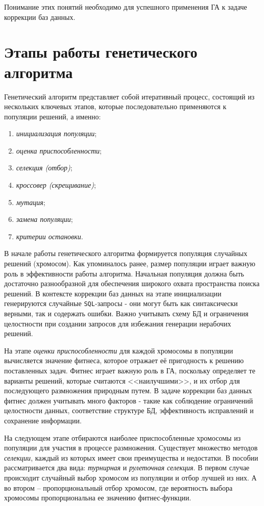 \documentclass[master,paper]{pmk-graduate}
\begin{document}
Понимание этих понятий необходимо для успешного применения ГА к задаче коррекции баз данных.

\section{Этапы работы генетического алгоритма}
\label{sec12} 

Генетический алгоритм представляет собой итеративный процесс, состоящий из нескольких ключевых этапов, которые последовательно применяются к популяции решений, а именно:

\begin{enumerate}
	\item \textit{инициализация популяции};
	\item \textit{оценка приспособленности};
	\item \textit{селекция (отбор)};
	\item \textit{кроссовер (скрещивание)};
	\item \textit{мутация};
	\item \textit{замена популяции};
	\item \textit{критерии остановки}.
\end{enumerate}

В начале работы генетического алгоритма формируется популяция случайных решений (хромосом). Как упоминалось ранее, размер популяции играет важную роль в эффективности работы алгоритма. Начальная популяция должна быть достаточно разнообразной для обеспечения широкого охвата пространства поиска решений. В контексте коррекции баз данных на этапе инициализации генерируются случайные \texttt{SQL}-запросы - они могут быть как синтаксически верными, так и содержать ошибки. Важно учитывать схему БД и ограничения целостности при создании запросов для избежания генерации нерабочих решений.

На этапе \textit{оценки приспособленности} для каждой хромосомы в популяции вычисляется значение фитнеса, которое отражает её пригодность к решению поставленных задач. Фитнес играет важную роль в ГА, поскольку опреде\-ляет те варианты решений, которые считаются <<наилучшими>>, и их отбор для пос\-ледующего размножения природным путем. В задаче коррекции баз данных фитнес должен учитывать много факторов - такие как соблюдение ограничений целостности данных, соответствие структуре БД, эффективность исправ\-лений и сохранение информации.

На следующем этапе отбираются наиболее приспособленные хромосомы из популяции для участия в процессе размножения. Существует множество методов \textit{селекции}, каждый из которых имеет свои преимущества и недостатки. В пособии рассматривается два вида: \textit{турнирная} и \textit{рулеточная селекция}. В первом случае происходит случайный выбор хромосом из популяции и отбор лучшей из них. А во втором -- пропорциональный отбор хромосом, где вероятность выбора хромосомы пропорциональна ее значению фитнес-функции.
\end{document}

